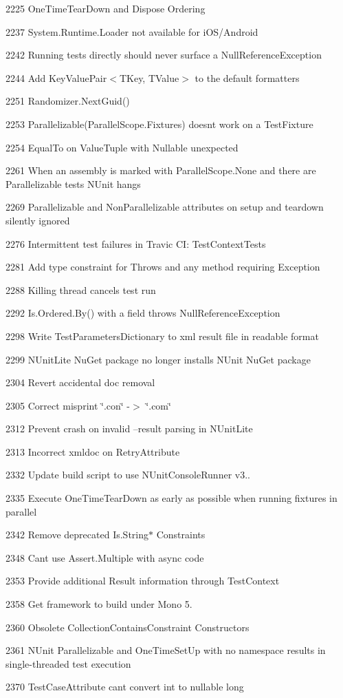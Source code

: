 \begin{DoxyItemize}
\item 2225 One\+Time\+Tear\+Down and Dispose Ordering
\item 2237 System.\+Runtime.\+Loader not available for i\+O\+S/\+Android
\item 2242 Running tests directly should never surface a Null\+Reference\+Exception
\item 2244 Add Key\+Value\+Pair$<$\+T\+Key, T\+Value$>$ to the default formatters
\item 2251 Randomizer.\+Next\+Guid()
\item 2253 Parallelizable(Parallel\+Scope.\+Fixtures) doesn\textquotesingle{}t work on a Test\+Fixture
\item 2254 Equal\+To on Value\+Tuple with Nullable unexpected
\item 2261 When an assembly is marked with Parallel\+Scope.\+None and there are Parallelizable tests N\+Unit hangs
\item 2269 Parallelizable and Non\+Parallelizable attributes on setup and teardown silently ignored
\item 2276 Intermittent test failures in Travic CI\+: Test\+Context\+Tests
\item 2281 Add type constraint for Throws and any method requiring Exception
\item 2288 Killing thread cancels test run
\item 2292 Is.\+Ordered.\+By() with a field throws Null\+Reference\+Exception
\item 2298 Write Test\+Parameters\+Dictionary to xml result file in readable format
\item 2299 N\+Unit\+Lite Nu\+Get package no longer installs N\+Unit Nu\+Get package
\item 2304 Revert accidental doc removal
\item 2305 Correct misprint \char`\"{}.\+con\char`\"{} -\/$>$ \char`\"{}.\+com\char`\"{}
\item 2312 Prevent crash on invalid --result parsing in N\+Unit\+Lite
\item 2313 Incorrect xmldoc on Retry\+Attribute
\item 2332 Update build script to use N\+Unit\+Console\+Runner v3..
\item 2335 Execute One\+Time\+Tear\+Down as early as possible when running fixtures in parallel
\item 2342 Remove deprecated Is.\+String$\ast$ Constraints
\item 2348 Can\textquotesingle{}t use Assert.\+Multiple with async code
\item 2353 Provide additional Result information through Test\+Context
\item 2358 Get framework to build under Mono 5.
\item 2360 Obsolete Collection\+Contains\+Constraint Constructors
\item 2361 N\+Unit Parallelizable and One\+Time\+Set\+Up with no namespace results in single-\/threaded test execution
\item 2370 Test\+Case\+Attribute can\textquotesingle{}t convert int to nullable long
\end{DoxyItemize}

